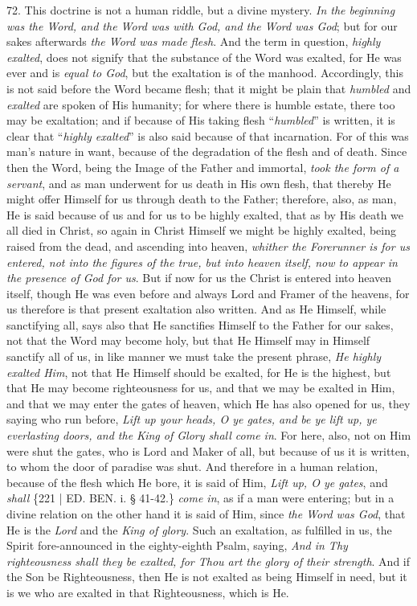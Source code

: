 72. This doctrine is not a
human riddle, but a divine mystery. \emph{In the beginning was the Word,
and the Word was with God, and the Word was God}; but for our sakes
afterwards \emph{the Word was made flesh}. And the term in question, \emph{highly
exalted}, does not signify that the substance of the Word was
exalted, for He was ever and is \emph{equal to God}, but the
exaltation is of the manhood. Accordingly, this is not said before the
Word became flesh; that it might be plain that \emph{humbled}
and \emph{exalted} are spoken of His humanity; for where there is
humble estate, there too may be exaltation; and if because of His
taking flesh ``\emph{humbled}'' is written, it is clear that ``\emph{highly
exalted}'' is also said because of that incarnation. For of this was
man's nature in want, because of the degradation of the flesh and of
death. Since then the Word, being the Image of the Father and
immortal, \emph{took the form of a servant}, and as man underwent for
us death in His own flesh, that thereby He might offer Himself for us
through death to the Father; therefore, also, as man, He is said
because of us and for us to be highly exalted, that as by His death we
all died in Christ, so again in Christ Himself we might be highly
exalted, being raised from the dead, and ascending into heaven, \emph{whither
the Forerunner is for us entered, not into the figures of the true,
but into heaven itself, now to appear in the presence of God for us}.
But if now for us the Christ is entered into heaven itself, though He
was even before and always Lord and Framer of the heavens, for us
therefore is that present exaltation also written. And as He Himself,
while sanctifying all, says also that He sanctifies Himself to the
Father for our sakes, not that the Word may become holy, but that He
Himself may in Himself sanctify all of us, in like manner we must take
the present phrase, \emph{He highly exalted Him}, not that He Himself
should be exalted, for He is the highest, but that He may become
righteousness for us, and that we may be exalted in Him, and that we
may enter the gates of heaven, which He has also opened for us, they
saying who run before, \emph{Lift up your heads, O ye gates, and be ye
lift up, ye everlasting doors, and the King of Glory shall come in}.
For here, also, not on Him were shut the gates, who is Lord and Maker
of all, but because of us it is written, to whom the door of paradise
was shut. And therefore in a human relation, because of the flesh
which He bore, it is said of Him, \emph{Lift up, O ye gates}, and \emph{shall}
\{221 | ED. BEN. i. § 41-42.\} \emph{come
in}, as if a man were entering; but in a divine relation on the
other hand it is said of Him, since \emph{the Word was God}, that He
is the \emph{Lord} and the \emph{King of glory}. Such an exaltation,
as fulfilled in us, the Spirit fore-announced in the eighty-eighth
Psalm, saying, \emph{And in Thy righteousness shall they be exalted, for
Thou art the glory of their strength}. And if the Son be
Righteousness, then He is not exalted as being Himself in need, but it
is we who are exalted in that Righteousness, which is He.

